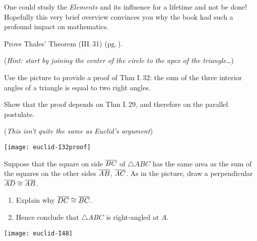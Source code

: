 One could study the \emph{Elements} and its influence for a lifetime and not be done! Hopefully this very brief overview convinces you why the book had such a profound impact on mathematics.


\begin{exercises}
	\exstart Prove Thales' Theorem (III.\,31) (pg.\,\pageref{pg:thalesthm}).\vspace{-6pt}
	
	\begin{enumerate}\setcounter{enumi}{1}
	  \item[](\emph{Hint: start by joining the center of the circle to the apex of the triangle\ldots})
	  
	  \begin{minipage}[t]{0.7\linewidth}\vspace{0pt}
		  \item%
		  Use the picture to provide a proof of Thm I.\,32: the sum of the three interior angles of a triangle is equal to two right angles.\par
		  Show that the proof depends on Thm I.\,29, and therefore on the parallel postulate.\par
		  (\emph{This isn't quite the same as Euclid's argument})
	  \end{minipage}
	  \hfill
	  \begin{minipage}[t]{0.29\linewidth}\vspace{0pt}
	  	\flushright
	  	\texttt{[image: euclid-I32proof]}
	  \end{minipage}
	  
	  
	  \begin{minipage}[t]{0.7\linewidth}\vspace{0pt}
		  \item\label{exs:pythagconv} Suppose that the square on side $\overline{BC}$ of $\triangle ABC$ has the same area as the sum of the squares on the other sides $\overline{AB}$, $\overline{AC}$. As in the picture, draw a perpendicular $\overline{AD}\cong \overline{AB}$.
		  \begin{enumerate}
		    \item Explain why $\overline{DC}\cong\overline{BC}$.
		    \item Hence conclude that $\triangle ABC$ is right-angled at $A$.
		  \end{enumerate}
	  \end{minipage}
	  \hfill
	  \begin{minipage}[t]{0.29\linewidth}\vspace{0pt}
	  	\flushright
	  	\texttt{[image: euclid-I48]}
	  \end{minipage}
	

\end{enumerate}
\end{exercises}
